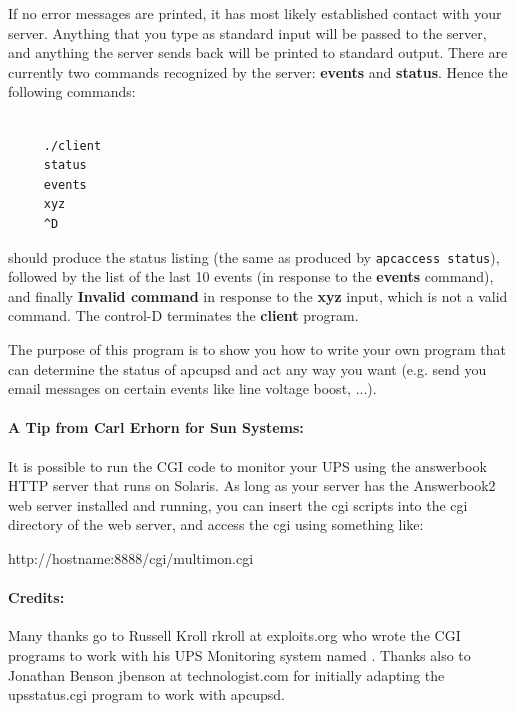 {{{{{{{{If no error messages are printed, it has most likely established contact with
your server. Anything that you type as standard input will be passed to the
server, and anything the server sends back will be printed to standard output.
There are currently two commands recognized by the server: {\bf events} and
{\bf status}.  Hence the following commands: 

\footnotesize
\begin{verbatim}
     
     ./client
     status
     events
     xyz
     ^D
\end{verbatim}
\normalsize

should produce the status listing (the same as produced by {\tt apcaccess
status}), followed by the list of the last 10 events (in response to the {\bf
events} command), and finally {\bf Invalid command} in response to the {\bf
xyz} input, which is not a valid command. The control-D terminates the {\bf
client} program.  

The purpose of this program is to show you how to write your own program that
can determine the status of apcupsd and act any way you want (e.g. send you
email messages on certain events like line voltage boost, ...). 

\label{A-Tip-from-Carl-Erhorn-for-Sun-Systems}

\paragraph*{A Tip from Carl Erhorn for Sun Systems:}

\label{index-Tip-137}
It is possible to run the CGI code to monitor your UPS using the answerbook
HTTP server that runs on Solaris. As long as your server has the Answerbook2
web server installed and running, you can insert the cgi scripts into the cgi
directory of the web server, and access the cgi using something like:  

http://hostname:8888/cgi/multimon.cgi 

\label{Credits}

\paragraph*{Credits:}

Many thanks go to Russell Kroll \lt{}rkroll at exploits.org\gt{} who wrote the
CGI programs to work with his UPS Monitoring system named 
. Thanks also to
Jonathan Benson \lt{}jbenson at technologist.com\gt{} for initially adapting
the upsstatus.cgi program to work with apcupsd.  

}}}}}}}}
